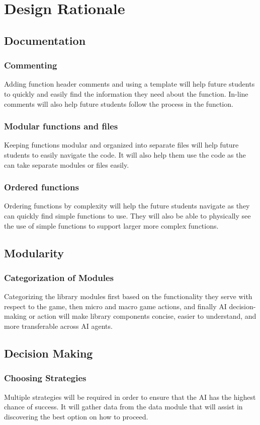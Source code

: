 \documentclass[10pt,letterpaper,onecolumn,draftclsnofoot]{IEEEtran}
\begin{document}
\section{Design Rationale}
\subsection{Documentation}
\subsubsection{Commenting}
	Adding function header comments and using a template will help future students to quickly and easily find the information they need about the function. In-line comments will also help future students follow the process in the function.

\subsubsection{Modular functions and files}
	Keeping functions modular and organized into separate files will help future students to easily navigate the code. It will also help them use the code as the can take separate modules or files easily.

\subsubsection{Ordered functions}
	Ordering functions by complexity will help the future students navigate as they can quickly find simple functions to use. They will also be able to physically see the use of simple functions to support larger more complex functions.
\subsection{Modularity}
\subsubsection{Categorization of Modules}
	Categorizing the library modules first based on the functionality they serve with respect to the game, then micro and macro game actions, and finally AI decision-making or action will make library components concise, easier to understand, and more transferable across AI agents.
\subsection{Decision Making}
\subsubsection{Choosing Strategies}
	Multiple strategies will be required in order to ensure that the AI has the highest chance of success. It will gather data from the data module that will assist in discovering the best option on how to proceed. 
\end{document}
